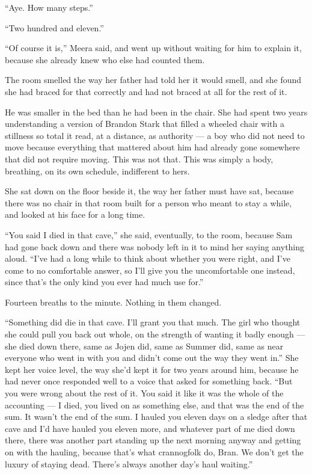 “Aye. How many steps.”

“Two hundred and eleven.”

“Of course it is,” Meera said, and went up without waiting for him to explain it, because she already knew who else had counted them.

\sceneBreak

The room smelled the way her father had told her it would smell, and she found she had braced for that correctly and had not braced at all for the rest of it.

He was smaller in the bed than he had been in the chair. She had spent two years understanding a version of Brandon Stark that filled a wheeled chair with a stillness so total it read, at a distance, as authority — a boy who did not need to move because everything that mattered about him had already gone somewhere that did not require moving. This was not that. This was simply a body, breathing, on its own schedule, indifferent to hers.

She sat down on the floor beside it, the way her father must have sat, because there was no chair in that room built for a person who meant to stay a while, and looked at his face for a long time.

“You said I died in that cave,” she said, eventually, to the room, because Sam had gone back down and there was nobody left in it to mind her saying anything aloud. “I’ve had a long while to think about whether you were right, and I’ve come to no comfortable answer, so I’ll give you the uncomfortable one instead, since that’s the only kind you ever had much use for.”

Fourteen breaths to the minute. Nothing in them changed.

“Something did die in that cave. I’ll grant you that much. The girl who thought she could pull you back out whole, on the strength of wanting it badly enough — she died down there, same as Jojen did, same as Summer did, same as near everyone who went in with you and didn’t come out the way they went in.” She kept her voice level, the way she’d kept it for two years around him, because he had never once responded well to a voice that asked for something back. “But you were wrong about the rest of it. You said it like it was the whole of the accounting — I died, you lived on as something else, and that was the end of the sum. It wasn’t the end of the sum. I hauled you eleven days on a sledge after that cave and I’d have hauled you eleven more, and whatever part of me died down there, there was another part standing up the next morning anyway and getting on with the hauling, because that’s what crannogfolk do, Bran. We don’t get the luxury of staying dead. There’s always another day’s haul waiting.”

